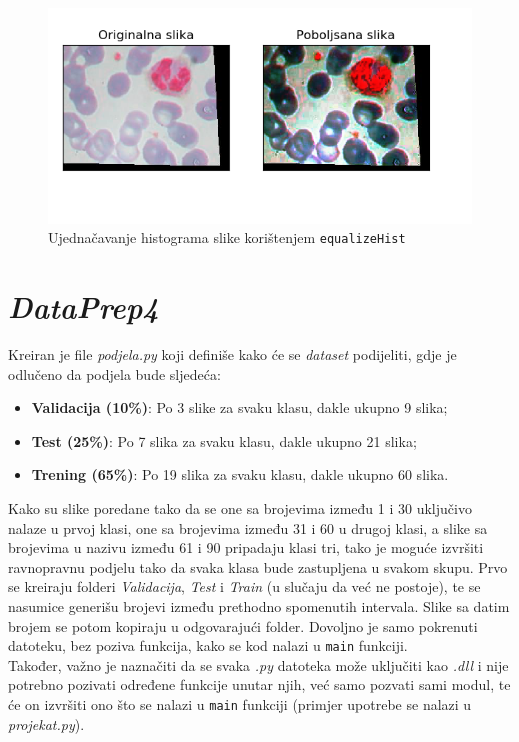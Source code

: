 \documentclass[12pt,a4paper]{article}
\begin{document}
\begin{enumerate}
\begin{figure}[H]
\center
\includegraphics[scale=0.9]{s11Histogram3.png}
\caption{Ujednačavanje histograma slike korištenjem \texttt{equalizeHist}}
	
\end{figure}

\end{enumerate}

\newpage

\section{\textit{DataPrep4}}

Kreiran je file \textit{podjela.py} koji definiše kako će se \textit{dataset} podijeliti, gdje je odlučeno da podjela bude sljedeća:

\begin{itemize}

\item \textbf{Validacija (10\%)}: Po 3 slike za svaku klasu, dakle ukupno 9 slika;
\item \textbf{Test (25\%)}: Po 7 slika za svaku klasu, dakle ukupno 21 slika;
\item \textbf{Trening (65\%)}: Po 19 slika za svaku klasu, dakle ukupno 60 slika.

\end{itemize}

Kako su slike poredane tako da se one sa brojevima između 1 i 30 uključivo nalaze u prvoj klasi, one sa brojevima između 31 i 60 u drugoj klasi, a slike sa brojevima u nazivu između 61 i 90 pripadaju klasi tri, tako je moguće izvršiti ravnopravnu podjelu tako da svaka klasa bude zastupljena u svakom skupu. Prvo se kreiraju folderi \textit{Validacija}, \textit{Test} i \textit{Train} (u slučaju da već ne postoje), te se nasumice generišu brojevi između prethodno spomenutih intervala. Slike sa datim brojem se potom kopiraju u odgovarajući folder. Dovoljno je samo pokrenuti datoteku, bez poziva funkcija, kako se kod nalazi u \texttt{main} funkciji. \\

Također, važno je naznačiti da se svaka \textit{.py} datoteka može uključiti kao \textit{.dll} i nije potrebno pozivati određene funkcije unutar njih, već samo pozvati sami modul, te će on izvršiti ono što se nalazi u \texttt{main} funkciji (primjer upotrebe se nalazi u \textit{projekat.py}).
\end{document}
